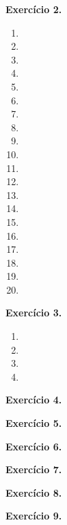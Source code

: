 \documentclass[12pt,a4paper]{article}
\begin{document}
\vspace{0.5cm}
\noindent\textbf{Exercício 2.}
\begin{enumerate}
    \renewcommand{\theenumi}{\alph{enumi}}
    \renewcommand{\labelenumi}{\theenumi)}
    \item 
    \item 
    \item 
    \item 
    \item 
    \item 
    \item 
    \item 
    \item 
    \item 
    \item 
    \item 
    \item 
    \item 
    \item 
    \item 
    \item 
    \item 
    \item 
    \item 
\end{enumerate}

\vspace{0.5cm}
\noindent\textbf{Exercício 3.}
\begin{enumerate}
    \renewcommand{\theenumi}{\alph{enumi}}
    \renewcommand{\labelenumi}{\theenumi)}
    \item 
    \item 
    \item 
    \item 
\end{enumerate}

\vspace{0.5cm}
\noindent\textbf{Exercício 4.}

\vspace{0.5cm}
\noindent\textbf{Exercício 5.}

\vspace{0.5cm}
\noindent\textbf{Exercício 6.}

\vspace{0.5cm}
\noindent\textbf{Exercício 7.}

\vspace{0.5cm}
\noindent\textbf{Exercício 8.}

\vspace{0.5cm}
\noindent\textbf{Exercício 9.}
\end{document}
